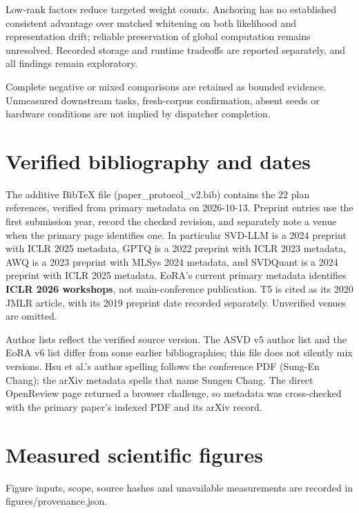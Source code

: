 \documentclass[10pt]{article}
\begin{document}
Low-rank factors reduce targeted weight counts. Anchoring has no established consistent advantage over matched whitening on both likelihood and representation drift; reliable preservation of global computation remains unresolved. Recorded storage and runtime tradeoffs are reported separately, and all findings remain exploratory.

Complete negative or mixed comparisons are retained as bounded evidence. Unmeasured downstream tasks, fresh-corpus confirmation, absent seeds or hardware conditions are not implied by dispatcher completion.

\section{Verified bibliography and dates}

The additive BibTeX file (paper\_protocol\_v2.bib) contains the 22 plan references,
verified from primary metadata on 2026-10-13. Preprint entries use the first
submission year, record the checked revision, and separately note a venue when
the primary page identifies one. In particular SVD-LLM is a 2024 preprint with
ICLR 2025 metadata, GPTQ is a 2022 preprint with ICLR 2023 metadata, AWQ is a
2023 preprint with MLSys 2024 metadata, and SVDQuant is a 2024 preprint with ICLR
2025 metadata. EoRA's current primary metadata identifies \textbf{ICLR 2026 workshops},
not main-conference publication. T5 is cited as its 2020 JMLR article, with its
2019 preprint date recorded separately. Unverified venues are omitted.

Author lists reflect the verified source version. The ASVD v5 author list and
the EoRA v6 list differ from some earlier bibliographies; this file does not
silently mix versions. Hsu et al.'s author spelling follows the conference PDF
(Sung-En Chang); the arXiv metadata spells that name Sungen Chang. The direct
OpenReview page returned a browser challenge, so metadata was cross-checked
with the primary paper's indexed PDF and its arXiv record.

\section{Measured scientific figures}








Figure inputs, scope, source hashes and unavailable measurements are recorded in figures/provenance.json.
\end{document}
